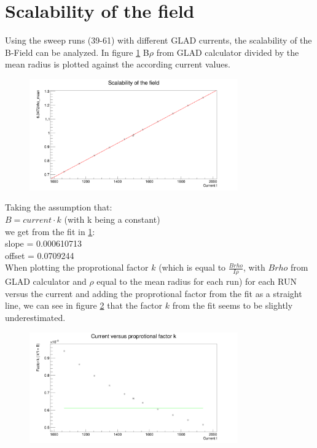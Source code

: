 \documentclass[12pt, letterpaper]{article}
\begin{document}
\section{Scalability of the field}
Using the sweep runs (39-61) with different GLAD currents, the scalability of the B-Field can be analyzed. In figure \ref{fig:scalar} B\textunderscore$\rho$  from GLAD calculator divided by the mean radius is plotted against the according current values.\\ 
 \begin{figure}[!htb]
	\includegraphics[width=0.8\textwidth]{scalar.png}
	\caption{\label{fig:scalar}}
	\label{fig:scalar}
\end{figure}
Taking the assumption that:\\
$B = current \cdot k $ (with k being a constant)\\
we get from the fit in \ref{fig:scalar}:\\
slope = 0.000610713 \\
offset = 0.0709244\\
When plotting the proprotional factor $k$ (which is equal to $\frac{Brho}{I\rho}$, with $Brho$ from GLAD calculator and $\rho$ equal to the mean radius for each run) for each RUN versus the current and adding the proprotional factor from the fit as a straight line, we can see in figure \ref{fig:factor_k} that the factor $k$ from the fit seems to be slightly underestimated. \\
\begin{figure}[!htb]
	\includegraphics[width=0.8\textwidth]{curent_vs_k_factor.png}
	\caption{\label{fig:factor_k}}
	\label{fig:factor_k}
\end{figure}
\end{document}
